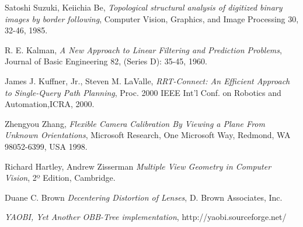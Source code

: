 \begin{thebibliography}{9}

	Satoshi Suzuki, Keiichia Be,
	\emph{Topological structural analysis of digitized binary images by border following},
	Computer Vision, Graphics, and Image Processing 30, 32-46,
	1985.
	
	R. E. Kalman,
	\emph{A New Approach to Linear Filtering and Prediction Problems},
	Journal of Basic Engineering 82, (Series D): 35-45,
	1960.

	James J. Kuffner, Jr., Steven M. LaValle,
	\emph{RRT-Connect: An Efficient Approach to Single-Query Path Planning},
	Proc. 2000 IEEE Int’l Conf. on Robotics and Automation,ICRA, 2000.

	Zhengyou Zhang,
	\emph{Flexible Camera Calibration By Viewing a Plane From Unknown Orientations},
	Microsoft Research, One Microsoft Way, Redmond, WA 98052-6399, USA
	1998.

	Richard Hartley, Andrew Zisserman
	\emph{Multiple View Geometry in Computer Vision},
	2º Edition, Cambridge.

	Duane C. Brown
	\emph{Decentering Distortion of Lenses},
	D. Brown Associates, Inc.

	\emph{YAOBI, Yet Another OBB-Tree implementation},
	http://yaobi.sourceforge.net/

\end{thebibliography}